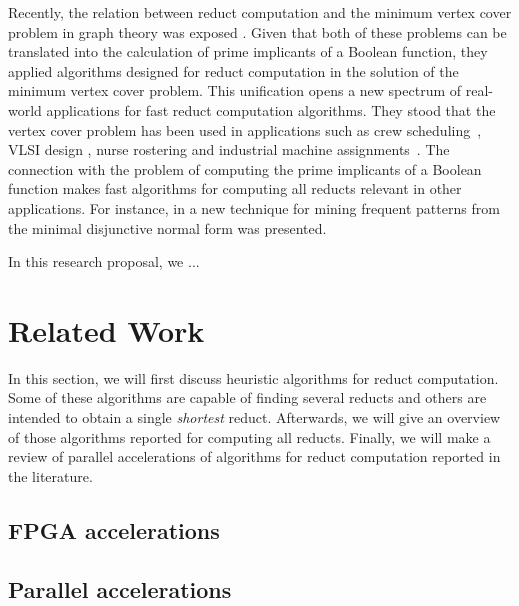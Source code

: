 \documentclass[citenumber]{elsarticle}
\begin{document}
	Recently, the relation between reduct computation and the minimum vertex cover problem in graph theory was exposed \cite{chen2015}. Given that both of these problems can be translated into the calculation of prime implicants of a Boolean function, they applied algorithms designed for reduct computation in the solution of the minimum vertex cover problem. This unification opens a new spectrum of real-world applications for fast reduct computation algorithms. They stood that the vertex cover problem has been used in applications such as crew scheduling~\cite{Sherali1984}, VLSI design \cite{Bhattacharyya2000}, nurse rostering \cite{Caprara1998} and industrial machine assignments~\cite{Woodyatt1993}. The connection with the problem of computing the prime implicants of a Boolean function makes fast algorithms for computing all reducts relevant in other applications. For instance, in \cite{Li2015} a new technique for mining frequent patterns from the minimal disjunctive normal form was presented.
	
	In this research proposal, we ...
%

\section{Related Work}\label{relatedWork}
  In this section, we will first discuss heuristic algorithms for reduct computation. Some of these algorithms are capable of finding several reducts and others are intended to obtain a single \textit{shortest} reduct. Afterwards, we will give an overview of those algorithms reported for computing all reducts. Finally, we will make a review of parallel accelerations of algorithms for reduct computation reported in the literature.    
%	
\subsection{FPGA accelerations}
%
  
%	
\subsection{Parallel accelerations}
%
	
%
\end{document}
